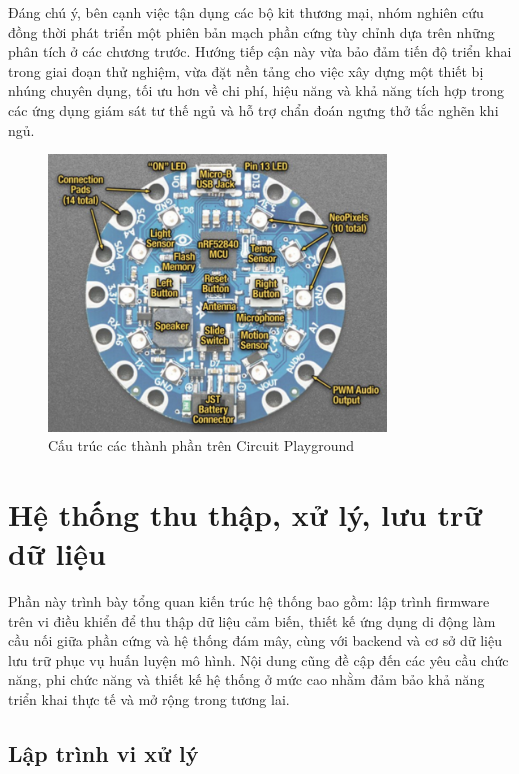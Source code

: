Đáng chú ý, bên cạnh việc tận dụng các bộ kit thương mại, nhóm nghiên cứu 
đồng thời phát triển một phiên bản mạch phần cứng tùy chỉnh dựa trên những 
phân tích ở các chương trước. Hướng tiếp cận này vừa bảo đảm tiến độ triển 
khai trong giai đoạn thử nghiệm, vừa đặt nền tảng cho việc xây dựng một 
thiết bị nhúng chuyên dụng, tối ưu hơn về chi phí, hiệu năng và khả năng 
tích hợp trong các ứng dụng giám sát tư thế ngủ và hỗ trợ chẩn đoán ngưng 
thở tắc nghẽn khi ngủ.  

\begin{figure}[htbp]
    \centering
    \includegraphics[width=0.8\textwidth]{images/detail_ada.png}
    \caption{Cấu trúc các thành phần trên Circuit Playground}
    \label{detail_ada}
\end{figure}



\section{Hệ thống thu thập, xử lý, lưu trữ dữ liệu}
Phần này trình bày tổng quan kiến trúc hệ thống bao gồm: 
lập trình firmware trên vi điều khiển để thu thập dữ liệu cảm biến, 
thiết kế ứng dụng di động làm cầu nối giữa phần cứng và hệ thống đám mây, 
cùng với backend và cơ sở dữ liệu lưu trữ phục vụ huấn luyện mô hình. 
Nội dung cũng đề cập đến các yêu cầu chức năng, phi chức năng và 
thiết kế hệ thống ở mức cao nhằm đảm bảo khả năng triển khai thực 
tế và mở rộng trong tương lai.


\subsection{Lập trình vi xử lý}

